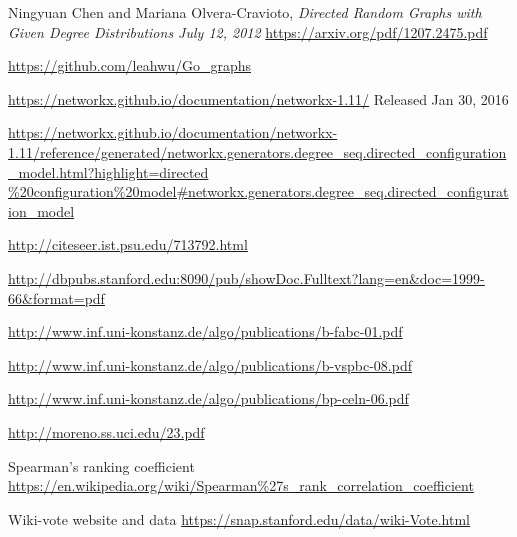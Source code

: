 \documentclass{article}
\begin{document}
\begin{thebibliography}{1}

   Ningyuan Chen and Mariana Olvera-Cravioto,
   \emph{ Directed Random Graphs with
Given Degree Distributions July 12, 2012
 } 
\url{https://arxiv.org/pdf/1207.2475.pdf}
 
 \url{https://github.com/leahwu/Go_graphs}
 
 
  \url{https://networkx.github.io/documentation/networkx-1.11/} 
  Released Jan 30, 2016
 
  \url{https://networkx.github.io/documentation/networkx-1.11/reference/generated/networkx.generators.degree_seq.directed_configuration_model.html?highlight=directed
  
\url{ http://citeseer.ist.psu.edu/713792.html}  

\url{http://dbpubs.stanford.edu:8090/pub/showDoc.Fulltext?lang=en&doc=1999-66&format=pdf}

\url{http://www.inf.uni-konstanz.de/algo/publications/b-fabc-01.pdf}

\url{http://www.inf.uni-konstanz.de/algo/publications/b-vspbc-08.pdf}

\url{http://www.inf.uni-konstanz.de/algo/publications/bp-celn-06.pdf}

\url{http://moreno.ss.uci.edu/23.pdf}
  
  Spearman's ranking coefficient
  \url{https://en.wikipedia.org/wiki/Spearman%27s_rank_correlation_coefficient}
  
  Wiki-vote website and data
\url{https://snap.stanford.edu/data/wiki-Vote.html}

  \end{thebibliography}
\end{document}
